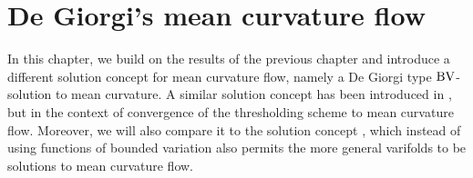 \chapter{De Giorgi's mean curvature flow}

In this chapter, we build on the results of the previous chapter and introduce 
a different solution concept for mean curvature flow, namely a De Giorgi type $ 
\operatorname{BV} 
$-solution to mean curvature. A similar solution concept has been introduced in 
\cite[Def.~1]{laux_lelmi_de_giorgis_inequality_for_the_threshholding_scheme}, 
but in the context of convergence of the thresholding scheme to mean curvature 
flow. Moreover, we will also compare it to the solution concept 
\cite[Def.~1]{hensel_laux_varifold_solution_concept_for_mean_curvature_flow}, 
which instead of using functions of bounded variation also permits the more 
general varifolds to be solutions to mean curvature flow.



